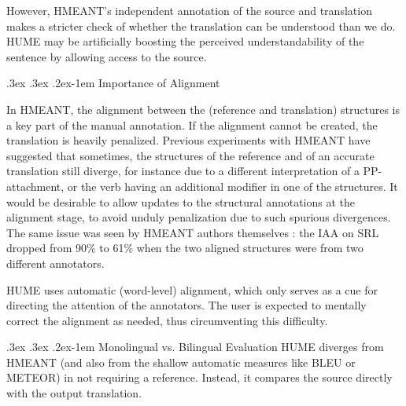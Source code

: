 \documentclass[11pt,letterpaper]{article}
\makeatletter
\renewcommand{\paragraph}{
  \@startsection{paragraph}{4}
  {\z@}{.3ex \@plus .3ex \@minus .2ex}{-1em}
  {\normalfont\normalsize\bfseries}
}
\def\parcite#1{\cite{#1}}
\makeatother
\begin{document}
However, HMEANT's independent annotation of the source and translation makes a stricter check
of whether the translation can be understood
than we do. HUME may be artificially boosting the perceived understandability of
the sentence by allowing access to the source.

\paragraph{Importance of Alignment}

In HMEANT, the alignment between the (reference and translation) structures is a key
part of the manual annotation. If the alignment cannot be created, the 
translation is heavily penalized.
Previous experiments with HMEANT
\parcite{bojar:wu:ssst:2012,chuchunkov-tarelkin-galinskaya:2014:SSST-8} have
suggested that sometimes, the structures of the reference and of an accurate translation
still diverge, for instance due to a different
interpretation of a PP-attachment, or the verb having an additional modifier in
one of the structures. It would be desirable to allow updates to the structural
annotations at the alignment stage,
to avoid unduly penalization due to such spurious divergences.
The same issue was seen by HMEANT authors themselves
\parcite{lo:wu:reliability:2014}:
the 
IAA on SRL dropped from 90\% to 61\% 
when the two aligned structures were from two different annotators.

HUME uses automatic (word-level) alignment, which only
serves as a cue for directing the attention of the annotators.
The user is expected to mentally correct the
alignment as needed, thus circumventing this difficulty.



\paragraph{Monolingual vs. Bilingual Evaluation}
\label{src-vs-ref}
HUME diverges from HMEANT (and also from the shallow automatic measures
like BLEU or METEOR) in not requiring a reference.
Instead, it compares the source directly with the output translation.
\end{document}
